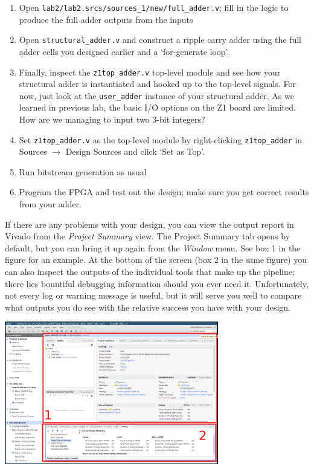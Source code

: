 \documentclass[11pt]{article}
\begin{document}
\begin{enumerate}
  \item Open \verb|lab2/lab2.srcs/sources_1/new/full_adder.v|; fill in the logic to produce the full adder outputs from the inputs
  \item Open \verb|structural_adder.v| and construct a ripple carry adder using the full adder cells you designed earlier and a `for-generate loop'.
  \item Finally, inspect the \verb|z1top_adder.v| top-level module and see how your structural adder is instantiated and hooked up to the top-level signals. For now, just look at the \verb|user_adder| instance of your structural adder.
 As we learned in previous lab, the basic I/O options on the Z1 board are limited. How are we managing to input two 3-bit integers?
  \item Set \texttt{z1top\_adder.v} as the top-level module by right-clicking \texttt{z1top\_adder} in Sources $\rightarrow$ Design Sources and click `Set as Top'.
  \item Run bitstream generation as usual
  \item Program the FPGA and test out the design; make sure you get correct results from your adder.
\end{enumerate}


If there are any problems with your design, you can view the output report in Vivado from the \emph{Project Summary} view. The Project Summary tab opens by default, but you can bring it up again from the \emph{Window} menu. See box 1 in the figure for an example. At the bottom of the screen (box 2 in the same figure) you can also inspect the outputs of the individual tools that make up the pipeline; there lies bountiful debugging information should you ever need it. Unfortunately, not every log or warning message is useful, but it will serve you well to compare what outputs you do see with the relative success you have with your design.

\begin{center}
  \includegraphics[width=0.7\textwidth]{figs/vivado_project_summary.png}
\end{center}
\end{document}
